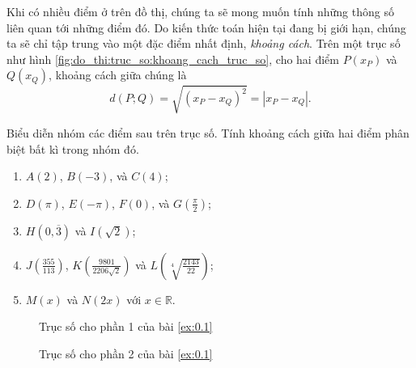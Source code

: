 Khi có nhiều điểm ở trên đồ thị, chúng ta sẽ mong muốn tính những thông số liên quan tới những điểm đó. Do kiến thức toán hiện tại đang bị giới hạn, chúng ta sẽ chỉ tập trung vào một đặc điểm nhất định, \emph{khoảng cách}. Trên một trục số như hình \ref{fig:do_thi:truc_so:khoang_cach_truc_so}, cho hai điểm $P(x_P)$ và $Q(x_Q)$, khoảng cách giữa chúng là $$d(P;Q)=\sqrt{(x_P-x_Q)^2}=|x_P-x_Q|.$$

\exercise[ex:0.1] Biểu diễn nhóm các điểm sau trên trục số. Tính khoảng cách giữa hai điểm phân biệt bất kì trong nhóm đó.
\begin{enumerate}
   \item $A(2)$, $B(-3)$, và $C(4)$;
   \item $D(\pi)$, $E(-\pi)$, $F(0)$, và $G\left(\frac{\pi}{2}\right)$;
   \item $H(0{,}\overline{3})$ và $I(\sqrt{2})$;
   \item $J\left(\frac{355}{113}\right)$, $K\left(\frac{9801}{2206\sqrt{2}}\right)$ và $L\left(\sqrt[4]{\frac{2143}{22}}\right)$;
   \item $M(x)$ và $N(2x)$ với $x\in\mathbb{R}$.
\end{enumerate}

\solution[ex:0.1] 
\begin{figure}[h]
   \centering
   \caption{Trục số cho phần 1 của bài \ref{ex:0.1}}
   \label{fig:do_thi:truc_so:truc_so_nguyen}
\end{figure}

\begin{figure}[h]
   \centering
   \caption{Trục số cho phần 2 của bài \ref{ex:0.1}}
   \label{fig:do_thi:truc_so:truc_so_pi}
\end{figure}

